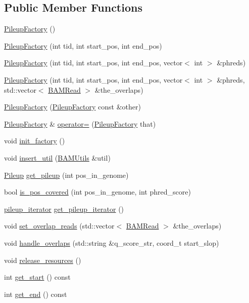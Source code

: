 \subsection*{Public Member Functions}
\begin{DoxyCompactItemize}
\item 
\hyperlink{class_pileup_factory_a0f382d75621a4b7d6cc5fd0c1d749e5e}{PileupFactory} ()
\item 
\hyperlink{class_pileup_factory_ae8550e54b25cea368a5cc8ba618a80e5}{PileupFactory} (int tid, int start\_\-pos, int end\_\-pos)
\item 
\hyperlink{class_pileup_factory_acbc56060b1f13b7d1cdb4acba5b6c451}{PileupFactory} (int tid, int start\_\-pos, int end\_\-pos, vector$<$ int $>$ \&phreds)
\item 
\hyperlink{class_pileup_factory_a2b95a68ddb7f2bcd6d828e6733cca118}{PileupFactory} (int tid, int start\_\-pos, int end\_\-pos, vector$<$ int $>$ \&phreds, std::vector$<$ \hyperlink{class_b_a_m_read}{BAMRead} $>$ \&the\_\-overlaps)
\item 
\hyperlink{class_pileup_factory_a34aafd5bef78d8b1cf6ed40cc7d07e70}{PileupFactory} (\hyperlink{class_pileup_factory}{PileupFactory} const \&other)
\item 
\hyperlink{class_pileup_factory}{PileupFactory} \& \hyperlink{class_pileup_factory_a152705c18ce0fb952bf89c0783752bca}{operator=} (\hyperlink{class_pileup_factory}{PileupFactory} that)
\item 
void \hyperlink{class_pileup_factory_a227de38502522bf50b855d1a8b7f5a6f}{init\_\-factory} ()
\item 
void \hyperlink{class_pileup_factory_a1920bc4147b24073bf616ffb29f7ab5c}{insert\_\-util} (\hyperlink{class_b_a_m_utils}{BAMUtils} \&util)
\item 
\hyperlink{class_pileup}{Pileup} \hyperlink{class_pileup_factory_ad61e4f1bfe0ce99004d5e07e0697d0de}{get\_\-pileup} (int pos\_\-in\_\-genome)
\item 
bool \hyperlink{class_pileup_factory_aa0f1f6e20f54688154b710a63b41d457}{is\_\-pos\_\-covered} (int pos\_\-in\_\-genome, int phred\_\-score)
\item 
\hyperlink{class_pileup_factory_1_1pileup__iterator}{pileup\_\-iterator} \hyperlink{class_pileup_factory_ab41f2591c7092b2800ba8768a3b593a6}{get\_\-pileup\_\-iterator} ()
\item 
void \hyperlink{class_pileup_factory_a4d203d432afda6c43c207f4b5e4062de}{set\_\-overlap\_\-reads} (std::vector$<$ \hyperlink{class_b_a_m_read}{BAMRead} $>$ \&the\_\-overlaps)
\item 
void \hyperlink{class_pileup_factory_abfb03a6dad3dbc9d7216c2d96174b42f}{handle\_\-overlaps} (std::string \&q\_\-score\_\-str, coord\_\-t start\_\-slop)
\item 
void \hyperlink{class_pileup_factory_a735687db4dba9bbd23d4ecca73b9fc1a}{release\_\-resources} ()
\item 
int \hyperlink{class_pileup_factory_a7fa771e82cda5f6c17bc3c488bac9ad6}{get\_\-start} () const 
\item 
int \hyperlink{class_pileup_factory_af7f9b6c0c1d5c5d3615bbf7fb1024731}{get\_\-end} () const 
\end{DoxyCompactItemize}


